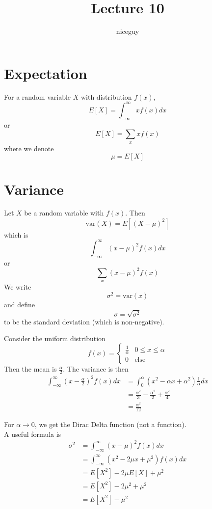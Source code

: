 \documentclass[12pt]{article}
\author{niceguy}
\title{Lecture 10}
\begin{document}
\maketitle

\section{Expectation}

For a random variable $X$ with distribution $f(x)$,
$$E[X] = \int_{-\infty}^\infty xf(x)dx$$
or
$$E[X] = \sum_x xf(x)$$
where we denote
$$\mu = E[X]$$

\section{Variance}
Let $X$ be a random variable with $f(x)$. Then
$$\text{var}(X) = E[(X-\mu)^2]$$
which is
$$\int_{-\infty}^\infty (x-\mu)^2f(x)dx$$
or
$$\sum_x (x-\mu)^2f(x)$$
We write
$$\sigma^2 = \text{var}(x)$$
and define
$$\sigma = \sqrt{\sigma^2}$$
to be the standard deviation (which is non-negative).

\begin{ex}
	Consider the uniform distribution
	$$f(x) = \begin{cases} \frac{1}{\alpha} & 0\leq x\leq \alpha \\ 0 & \text{else}\end{cases}$$
	Then the mean is $\frac{\alpha}{2}$. The variance is then
	\begin{align*}
		\int_{-\infty}^\infty \left(x-\frac{\alpha}{2}\right)^2f(x)dx &= \int_0^\alpha (x^2-\alpha x + \alpha^2)\frac{1}{\alpha} dx \\
									      &= \frac{\alpha^2}{3} - \frac{\alpha^2}{2} + \frac{\alpha^2}{4} \\
									      &= \frac{\alpha^2}{12}
	\end{align*}
\end{ex}

For $\alpha\rightarrow0$, we get the Dirac Delta function (not a function). \\

A useful formula is
\begin{align*}
	\sigma^2 &= \int_{-\infty}^\infty (x-\mu)^2f(x)dx \\
		 &= \int_{-\infty}^\infty (x^2 - 2\mu x + \mu^2)f(x)dx \\
		 &= E[X^2] - 2\mu E[X] + \mu^2 \\
		 &= E[X^2] - 2\mu^2 + \mu^2 \\
		 &= E[X^2] - \mu^2
\end{align*}
\end{document}
